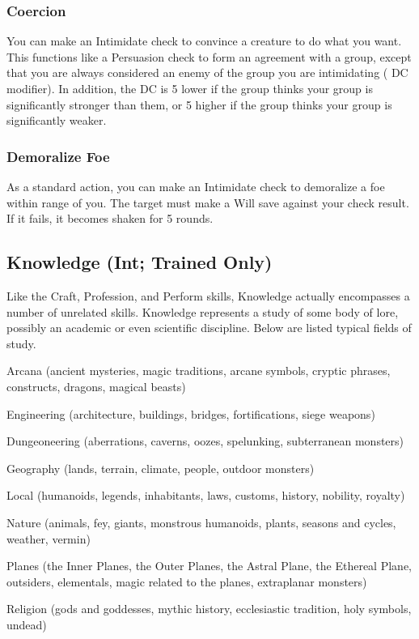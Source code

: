 \subsubsection{Coercion}
You can make an Intimidate check to convince a creature to do what you want. This functions like a Persuasion check to form an agreement with a group, except that you are always considered an enemy of the group you are intimidating ( DC modifier). In addition, the DC is 5 lower if the group thinks your group is significantly stronger than them, or 5 higher if the group thinks your group is significantly weaker.

\subsubsection{Demoralize Foe}
As a standard action, you can make an Intimidate check to demoralize a foe within \rngmed range of you. The target must make a Will save against your check result. If it fails, it becomes shaken for 5 rounds.

\subsection{Knowledge (Int; Trained Only)}
Like the Craft, Profession, and Perform skills, Knowledge actually encompasses a number of unrelated skills. Knowledge represents a study of some body of lore, possibly an academic or even scientific discipline. Below are listed typical fields of study.
\begin{itemize*}
\item Arcana (ancient mysteries, magic traditions, arcane symbols,
cryptic phrases, constructs, dragons, magical beasts)
\item Engineering (architecture, buildings, bridges, fortifications, siege weapons)
\item Dungeoneering (aberrations, caverns, oozes, spelunking, subterranean monsters)
\item Geography (lands, terrain, climate, people, outdoor monsters)
\item Local (humanoids, legends, inhabitants, laws, customs, history, nobility, royalty)
\item Nature (animals, fey, giants, monstrous humanoids, plants, seasons and cycles, weather, vermin)
\item Planes (the Inner Planes, the Outer Planes, the Astral Plane,
the Ethereal Plane, outsiders, elementals, magic related to the planes, extraplanar monsters)
\item Religion (gods and goddesses, mythic history, ecclesiastic tradition, holy symbols, undead)
\end{itemize*}

